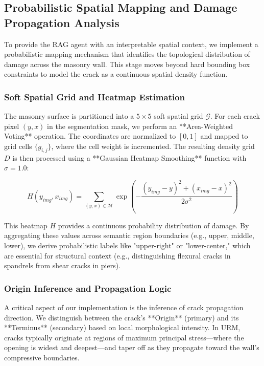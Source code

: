 \subsection{Probabilistic Spatial Mapping and Damage Propagation Analysis}
\label{sec:crack_location}

\begin{sloppypar}
To provide the RAG agent with an interpretable spatial context, we implement a probabilistic mapping mechanism that identifies the topological distribution of damage across the masonry wall. This stage moves beyond hard bounding box constraints to model the crack as a continuous spatial density function.
\end{sloppypar}

\subsubsection{Soft Spatial Grid and Heatmap Estimation}
\begin{sloppypar}
The masonry surface is partitioned into a $5 \times 5$ soft spatial grid $\mathcal{G}$. For each crack pixel $(y, x)$ in the segmentation mask, we perform an **Area-Weighted Voting** operation. The coordinates are normalized to $[0, 1]$ and mapped to grid cells $\{g_{i,j}\}$, where the cell weight is incremented. The resulting density grid $D$ is then processed using a **Gaussian Heatmap Smoothing** function with $\sigma = 1.0$:
\end{sloppypar}

\begin{equation}
    H(y_{img}, x_{img}) = \sum_{(y,x) \in \mathcal{M}} \exp \left( -\frac{(y_{img}-y)^2 + (x_{img}-x)^2}{2\sigma^2} \right)
\end{equation}

\noindent This heatmap $H$ provides a continuous probability distribution of damage. By aggregating these values across semantic region boundaries (e.g., upper, middle, lower), we derive probabilistic labels like "upper-right" or "lower-center," which are essential for structural context (e.g., distinguishing flexural cracks in spandrels from shear cracks in piers).

\subsubsection{Origin Inference and Propagation Logic}
\begin{sloppypar}
A critical aspect of our implementation is the inference of crack propagation direction. We distinguish between the crack's **Origin** (primary) and its **Terminus** (secondary) based on local morphological intensity. In URM, cracks typically originate at regions of maximum principal stress—where the opening is widest and deepest—and taper off as they propagate toward the wall's compressive boundaries. 
\end{sloppypar}

